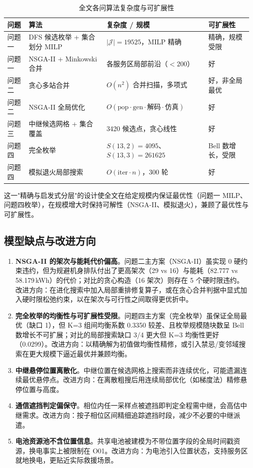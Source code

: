 \begin{table}[htbp]
\centering
\caption{全文各问算法复杂度与可扩展性}
\label{tab:complexity}
\small
\begin{tabular}{llll}
\toprule
\textbf{问题} & \textbf{算法} & \textbf{复杂度 / 规模} & \textbf{可扩展性} \\
\midrule
问题一 & DFS 候选枚举 + 集合划分 MILP & $|\mathcal{J}|=19525$，MILP 精确 & 精确，规模受限 \\
问题一 & NSGA-II + Minkowski 合并 & 各服务区局部前沿（$<200$） & 好 \\
问题二 & 贪心多站合并 & $O(n^2)$ 合并扫描，多项式 & 好，非全局最优 \\
问题二 & NSGA-II 全局优化 & $O(\text{pop}\cdot\text{gen}\cdot\text{解码}\cdot\text{仿真})$ & 好 \\
问题三 & 中继候选网格 + 集合覆盖 & 3420 候选点，贪心线性 & 好 \\
问题四 & 完全枚举 & $S(13,2)=4095$、$S(13,3)=261625$ & Bell 数增长，受限 \\
问题四 & 模拟退火局部搜索 & $O(\text{iter}\cdot n)$，300 轮 & 好 \\
\bottomrule
\end{tabular}
\end{table}

这一"精确与启发式分层"的设计使全文在给定规模内保证最优性（问题一 MILP、问题四枚举），在规模增大时保持可解性（NSGA-II、模拟退火），兼顾了最优性与可扩展性。

\subsection{模型缺点与改进方向}

\begin{enumerate}
    \item \textbf{NSGA-II 的架次与能耗代价偏高}。问题二主方案（NSGA-II）虽实现 0 硬约束违约，但为规避机身排队付出了更高架次（29 vs 16）与能耗（82.777 vs 58.179\,kWh）的代价；对比的贪心构造（16 架次）则存在 5 个硬时限违约。改进方向：在进化搜索中加入局部重排修复算子，或在贪心合并判据中显式加入硬时限松弛约束，以在架次与可行性之间取得更优折中。
    \item \textbf{完全枚举的均衡性与可扩展性受限}。问题四主方案（完全枚举）虽保证全局最优（缺口 1），但 K=3 组间均衡系数 0.3350 较差、且枚举规模随块数呈 Bell 数增长不可扩展；对比的局部搜索缺口 3/4 更大但 K=3 均衡性更好（0.0299）。改进方向：以精确解为初值做均衡性精修，或引入禁忌/变邻域搜索在更大规模下逼近最优并兼顾均衡。
    \item \textbf{中继悬停位置离散化}。中继位置在候选网格上搜索而非连续优化，可能遗漏连续最优悬停点。改进方向：在离散粗搜后用连续局部优化（如梯度法）精修悬停位置与高度。
    \item \textbf{通信遮挡判定偏保守}。相位内任一采样点被遮挡即判定全程需中继，会高估中继需求。改进方向：按子相位区间精细追踪遮挡时段，减少不必要的中继派遣。
    \item \textbf{电池资源池不含位置信息}。共享电池被建模为不带位置字段的全局时间戳资源，换电事实上被限制在 O01。改进方向：为电池引入位置状态，支持服务区就地换电，更贴近实际救援场景。
\end{enumerate}

